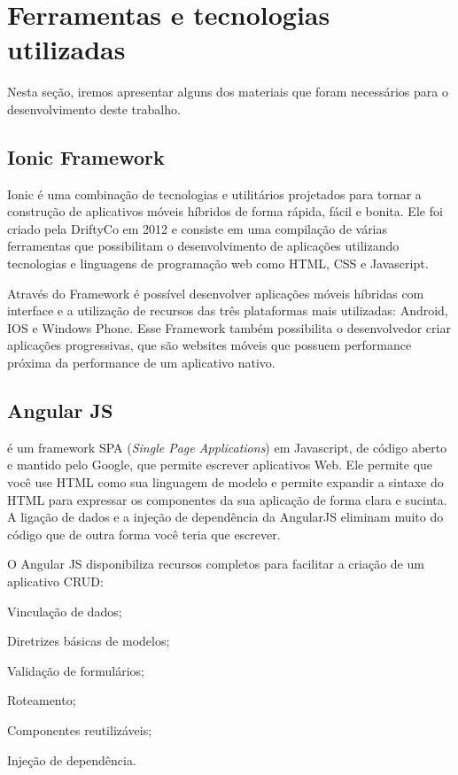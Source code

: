 \section{Ferramentas e tecnologias utilizadas} \label{sec:ferramentas} 
Nesta seção, iremos apresentar alguns dos materiais que foram necessários para o desenvolvimento deste trabalho.


\subsection{Ionic Framework}

Ionic é uma combinação de tecnologias e utilitários projetados para tornar a construção de aplicativos móveis híbridos de forma rápida, fácil e bonita. Ele foi criado pela DriftyCo em 2012 e consiste em uma compilação de várias ferramentas que possibilitam o desenvolvimento de aplicações utilizando tecnologias e linguagens de programação web como HTML, CSS e Javascript.

Através do \citeauthor{ionic2017} Framework é possível desenvolver aplicações móveis híbridas com interface e a utilização de recursos das três plataformas mais utilizadas: Android, IOS e Windows Phone. Esse Framework também possibilita o desenvolvedor criar aplicações progressivas, que são websites móveis que possuem performance próxima da performance de um aplicativo nativo.

\subsection{Angular JS}
\citeauthor{angularjs2017} é um framework SPA (\textit{Single Page Applications}) em Javascript, de código aberto e mantido pelo Google,
que permite escrever aplicativos Web. Ele permite que você use HTML como sua linguagem de modelo e permite expandir a sintaxe do HTML para expressar os componentes da sua aplicação de forma clara e sucinta. A ligação de dados e a injeção de dependência da AngularJS eliminam muito do código que de outra forma você teria que escrever.

O Angular JS disponibiliza recursos completos para facilitar a criação de um aplicativo CRUD: 
\begin{lista}
	\item Vinculação de dados;
	\item Diretrizes básicas de modelos;
	\item Validação de formulários; 
	\item Roteamento;
	\item Componentes reutilizáveis;
	\item Injeção de dependência.
\end{lista}

